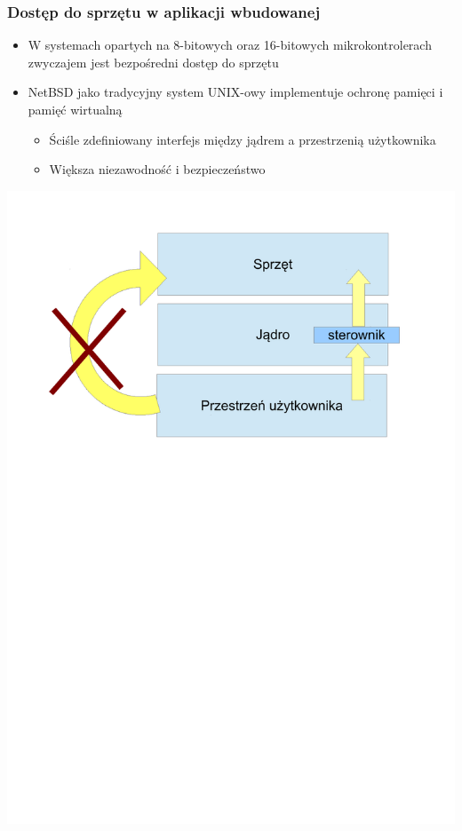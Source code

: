 \documentclass[dvipsnames,table]{beamer}
\begin{document}
\begin{frame}
\frametitle{Dostęp do sprzętu w aplikacji wbudowanej}
\begin{itemize}
	\item W systemach opartych na 8-bitowych oraz 16-bitowych mikrokontrolerach zwyczajem jest bezpośredni dostęp do sprzętu
	\item NetBSD jako tradycyjny system UNIX-owy implementuje ochronę pamięci i pamięć wirtualną
	\begin{itemize}
		\item Ściśle zdefiniowany interfejs między jądrem a przestrzenią użytkownika
		\item Większa niezawodność i bezpieczeństwo
	\end{itemize}
\end{itemize}
\begin{center}
\includegraphics[scale=0.33]{img_hwaccess.pdf}
\end{center}
\end{frame}
\end{document}
